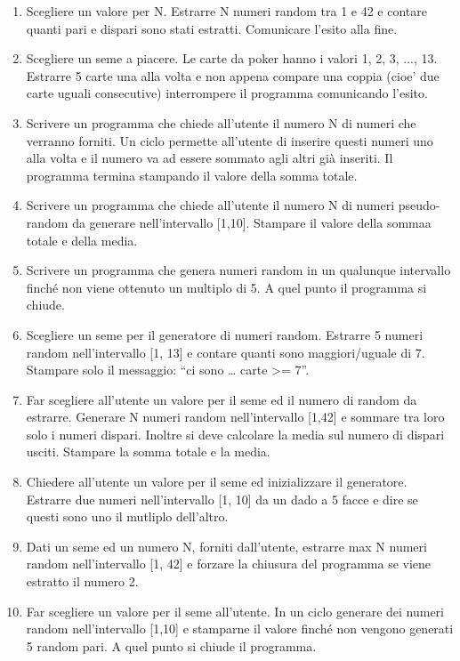 \documentclass{article}
\begin{document}
\begin{enumerate}
\item Scegliere un valore per N. Estrarre N numeri random tra 1 e 42 e contare quanti pari e dispari sono stati estratti. Comunicare l'esito alla fine.

\item Scegliere un seme a piacere. Le carte da poker hanno i valori 1, 2, 3, ..., 13. Estrarre 5 carte una alla volta e non appena compare una coppia (cioe' due carte uguali consecutive) interrompere il programma comunicando l'esito.

\item Scrivere un programma che chiede all'utente il numero N di numeri che verranno forniti. Un ciclo permette all'utente di inserire questi numeri uno alla volta e  il numero va ad essere sommato agli altri già inseriti. Il programma termina stampando il valore della somma totale.

\item Scrivere un programma che chiede all'utente il numero N di numeri pseudo-random da generare nell'intervallo [1,10]. Stampare il valore della sommaa totale e della media.

\item Scrivere un programma che genera numeri random in un qualunque intervallo finché non viene ottenuto un multiplo di 5. A quel punto il programma si chiude.

\item Scegliere un seme per il generatore di numeri random. Estrarre 5 numeri  random nell’intervallo [1, 13] e contare quanti sono maggiori/uguale di 7. Stampare solo il messaggio: “ci sono … carte >= 7”.

\item Far scegliere all’utente un valore per il seme ed il numero di random da estrarre. Generare N numeri random nell’intervallo [1,42] e sommare tra loro solo i numeri dispari. Inoltre si deve calcolare la media sul numero di dispari usciti. Stampare la somma totale e la media.

\item Chiedere all’utente un valore per il seme ed inizializzare il generatore. Estrarre due numeri nell’intervallo [1, 10] da un dado a 5 facce e dire se questi sono uno il mutliplo dell’altro.

\item Dati un seme ed un numero N, forniti dall’utente, estrarre max N numeri random nell’intervallo [1, 42] e forzare la chiusura del programma se viene estratto il numero 2.

\item Far scegliere un valore per il seme all’utente. In un ciclo generare dei numeri random nell’intervallo [1,10] e stamparne il valore finché non vengono generati 5 random pari. A quel punto si chiude il programma.


\end{enumerate}
\end{document}
